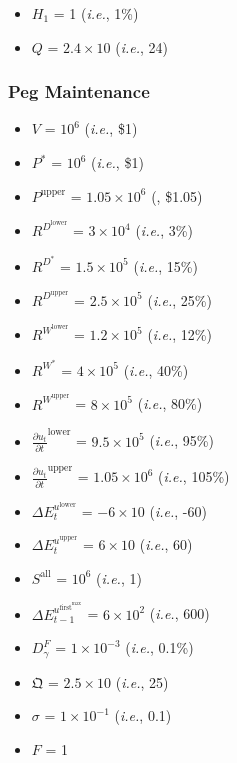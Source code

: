\documentclass[class=article, crop=false]{standalone}
\begin{document}
\begin{itemize}[topsep=0pt, itemsep=3pt,leftmargin=16pt]
    \item $H_{1}$ = 1 (\textit{i.e.}, 1\%)
    \item $Q$ = $2.4 \times 10$ (\textit{i.e.}, 24)
\end{itemize}


\subsubsection{Peg Maintenance}

\begin{itemize}[topsep=0pt, itemsep=3pt,leftmargin=16pt]
    \item $V$ = $10^{6}$ (\textit{i.e.}, \$1)
    \item $P^{*}$ = $10^{6}$ (\textit{i.e.}, \$1)
    \item $P^{\text{upper}}$ = $1.05 \times 10^{6}$ (, \$1.05)
    \item $R^{D^{\text{lower}}}$ = $3 \times 10^{4}$ (\textit{i.e.}, 3\%)
    \item $R^{D^{*}}$ = $1.5 \times 10^{5}$ (\textit{i.e.}, 15\%)
    \item $R^{D^{\text{upper}}}$ = $2.5 \times 10^{5}$ (\textit{i.e.}, 25\%)
    \item $R^{W^{\text{lower}}}$ = $1.2 \times 10^{5}$ (\textit{i.e.}, 12\%)
    \item $R^{W^{*}}$ = $4 \times 10^{5}$ (\textit{i.e.}, 40\%)
    \item $R^{W^{\text{upper}}}$ = $8 \times 10^{5}$ (\textit{i.e.}, 80\%)
    \item $\frac{\partial u_{t}}{\partial t}^{\text{lower}}$ = $9.5 \times 10^{5}$ (\textit{i.e.}, 95\%)
    \item $\frac{\partial u_{t}}{\partial t}^{\text{upper}}$ = $1.05 \times 10^{6}$ (\textit{i.e.}, 105\%)
    \item $\Delta E_{t}^{u^{\text{lower}}}$ = $-6 \times 10$ (\textit{i.e.}, -60)
    \item $\Delta E_{t}^{u^{\text{upper}}}$ = $6 \times 10$ (\textit{i.e.}, 60)
    \item $S^{\text{all}}$ = $10^{6}$ (\textit{i.e.}, 1)
    \item $\Delta E_{t-1}^{u^{\text{first}^{\text{max}}}}$ = $6 \times 10^{2}$ (\textit{i.e.}, 600)
    \item $D_{\gamma}^{F}$ = $1 \times 10^{-3}$ (\textit{i.e.}, 0.1\%)
    \item $\mathfrak{Q}$ = $2.5 \times 10$ (\textit{i.e.}, 25)
    \item $\sigma$ = $1 \times 10^{-1}$ (\textit{i.e.}, 0.1)
    \item $F$ = 1
\end{itemize}
\end{document}
